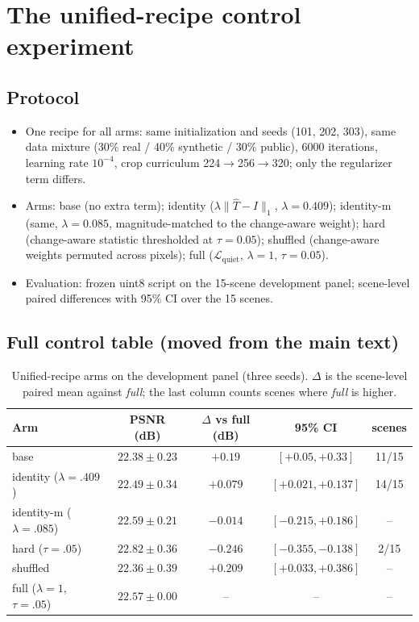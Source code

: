 \documentclass[10pt]{article}
\newcommand{\quiet}{\mathcal{L}_{\mathrm{quiet}}}
\begin{document}
\section{The unified-recipe control experiment}\label{supp:control}
\subsection{Protocol}
\begin{itemize}
\item One recipe for all arms: same initialization and seeds (101, 202, 303), same
  data mixture (30\% real / 40\% synthetic / 30\% public), 6000 iterations, learning
  rate $10^{-4}$, crop curriculum 224$\rightarrow$256$\rightarrow$320; only the
  regularizer term differs.
\item Arms: base (no extra term); identity ($\lambda\|\widehat T-I\|_1$,
  $\lambda=0.409$); identity-m (same, $\lambda=0.085$, magnitude-matched to the
  change-aware weight); hard (change-aware statistic thresholded at $\tau=0.05$);
  shuffled (change-aware weights permuted across pixels); full ($\quiet$,
  $\lambda=1$, $\tau=0.05$).
\item Evaluation: frozen uint8 script on the 15-scene development panel; scene-level
  paired differences with 95\% CI over the 15 scenes.
\end{itemize}

\subsection{Full control table (moved from the main text)}
\begin{table}[h]\centering
\caption{Unified-recipe arms on the development panel (three seeds). $\Delta$ is the
scene-level paired mean against \emph{full}; the last column counts scenes where
\emph{full} is higher.}
\begin{tabular}{@{}lcccc@{}}
\toprule
Arm & PSNR (dB) & $\Delta$ vs full (dB) & 95\% CI & scenes \\
\midrule
base & $22.38\pm0.23$ & $+0.19$ & $[+0.05,+0.33]$ & 11/15 \\
identity ($\lambda{=}.409$) & $22.49\pm0.34$ & $+0.079$ & $[+0.021,+0.137]$ & 14/15 \\
identity-m ($\lambda{=}.085$) & $22.59\pm0.21$ & $-0.014$ & $[-0.215,+0.186]$ & -- \\
hard ($\tau{=}.05$) & $22.82\pm0.36$ & $-0.246$ & $[-0.355,-0.138]$ & 2/15 \\
shuffled & $22.36\pm0.39$ & $+0.209$ & $[+0.033,+0.386]$ & -- \\
full ($\lambda{=}1$, $\tau{=}.05$) & $22.57\pm0.00$ & -- & -- & -- \\
\bottomrule
\end{tabular}
\end{table}
\end{document}

